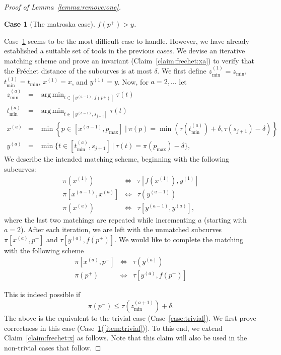 \documentclass[11pt, letter]{article}
\DeclareMathOperator*{\argmin}{arg\,min}
\newtheorem{case}[]{Case}
\newcommand{\lemref}[1]{Lemma~\ref{lemma:#1}}
\newcommand{\caselab}[1]{\label{case:#1}}
\newcommand{\caseref}[1]{Case~\ref{case:#1}}
\newcommand{\claimref}[1]{Claim~\ref{claim:#1}}
\newcommand{\Frechet}{Fr\'echet\xspace}
\providecommand{\pth}[2][\!]{#1\left({#2}\right)}
\providecommand{\brc}[1]{\left\{ {#1} \right\}}
\begin{document}
\begin{proof}[Proof of \lemref{remove:one}]
\begin{case}[The matroska case] $f(p^{+}) > y$.
\caselab{matroska}
\end{case}
\caseref{matroska} seems to be the most difficult case to handle. However, we have
already established a suitable set of tools in the previous cases. We devise an iterative
matching scheme and prove an invariant (\claimref{frechet:xa}) to verify that the \Frechet distance of
the subcurves is at most $\delta$.
We first define $z_{\min}^{(1)}=z_{\min}$, $t_{\min}^{(1)}=t_{\min}$, 
$x^{(1)}=x$, and $y^{(1)}=y$.
Now, for $a = 2, \dots$ let 
\begin{eqnarray*}
z_{\min}^{(a)} &=& \argmin_{t\in [y^{(a-1)},f(p^{+})] } \tau(t)\\
t_{\min}^{(a)} &=& \argmin_{t\in [y^{(a-1)},s_{j+1}]} \tau(t)\\
x^{(a)}&=&  \min\brc{p\in [x^{(a-1)},p_{\max}] ~|~ \pi(p) = \min\pth{\tau(t_{\min}^{(a)})+\delta,  \tau(s_{j+1})-\delta} } \\ 
y^{(a)}&=& \min \{t \in [t_{\min}^{(a)},s_{j+1}] ~|~ \tau(t) = \pi(p_{\max}) - \delta\},
\end{eqnarray*}
We describe the intended matching scheme, beginning with the following subcurves:
\begin{eqnarray*}
\pi(x^{(1)}) &\Leftrightarrow& \tau[f(x^{(1)}),y^{(1)}]\\
\pi[x^{(a-1)},x^{(a)}] &\Leftrightarrow& \tau(y^{(a-1)})\\
\pi(x^{(a)}) &\Leftrightarrow& \tau[y^{(a-1)},y^{(a)}],
\end{eqnarray*}
where the last two matchings are repeated while incrementing $a$ (starting with
$a=2$).   After each iteration, we are left with the
unmatched subcurves $\pi[x^{(a)}, p^{-}]$ and $\tau[y^{(a)}, f(p^{+})]$.  
We would like to complete the matching with the following scheme
\begin{eqnarray*}
\pi[x^{(a)},p^{-}] &\Leftrightarrow& \tau(y^{(a)})\\
\pi(p^{+}) &\Leftrightarrow& \tau[y^{(a)},f(p^{+})]
\end{eqnarray*}

This is indeed possible if 
\[ \pi(p^{-}) \leq \tau(z_{\min}^{(a+1)}) + \delta.\]
The above is the equivalent to the trivial case (\caseref{trivial}).  
We first prove correctness in this case (\caseref{matroska}(\ref{item:trivial})). To this end, we extend
\claimref{frechet:x} as follows. Note that this claim will also be used in the non-trivial cases that follow.


\end{proof}
\end{document}
